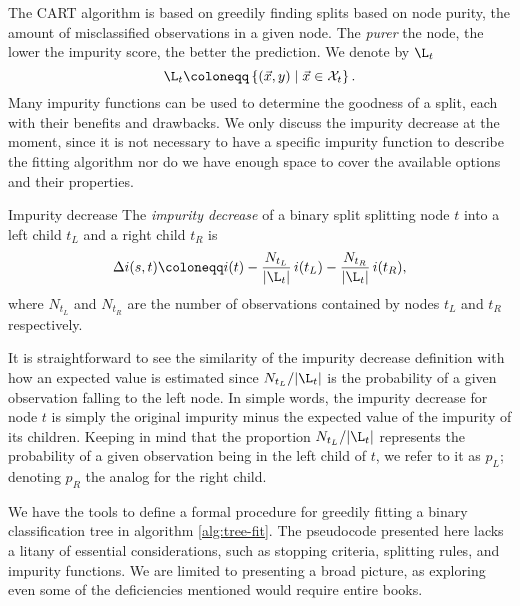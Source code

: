 The CART algorithm is based on greedily finding splits based on node purity, the
amount of misclassified observations in a given node. The \textit{purer} the
node, the lower the impurity score, the better the prediction. We denote by
$\L_t$
\[
    \L_t \coloneqq \left\{ (\vec{x}, y) \mid \vec{x} \in \mathcal{X}_t \right\}.
\]
Many impurity functions can be used to determine the goodness of a split, each
with their benefits and drawbacks. We only discuss the impurity decrease at the
moment, since it is not necessary to have a specific impurity function to
describe the fitting algorithm nor do we have enough space to cover the
available options and their properties.

\begin{dfn}{Impurity decrease}{}
    The \emph{impurity decrease} of a binary split splitting node $t$ into a
    left child $t_L$ and a right child $t_R$ is
    \[
        \Delta i(s, t) \coloneqq i(t) - \frac{N_{t_L}}{|\L_t|} \, i(t_L) - \frac{N_{t_R}}{|\L_t|} \, i(t_R),
    \]
    where $N_{t_L}$ and $N_{t_R}$ are the number of observations contained by
    nodes $t_L$ and $t_R$ respectively.
\end{dfn}

It is straightforward to see the similarity of the impurity decrease definition
with how an expected value is estimated since $N_{t_L} / |\L_t|$ is the
probability of a given observation falling to the left node. In simple words,
the impurity decrease for node $t$ is simply the original impurity minus the
expected value of the impurity of its children. Keeping in mind that the
proportion $N_{t_L} / |\L_t|$ represents the probability of a given observation
being in the left child of $t$, we refer to it as $p_L$; denoting $p_R$ the
analog for the right child.

We have the tools to define a formal procedure for greedily fitting a binary
classification tree in algorithm \ref{alg:tree-fit}. The pseudocode presented
here lacks a litany of essential considerations, such as stopping criteria,
splitting rules, and impurity functions. We are limited to presenting a broad
picture, as exploring even some of the deficiencies mentioned would require
entire books.

